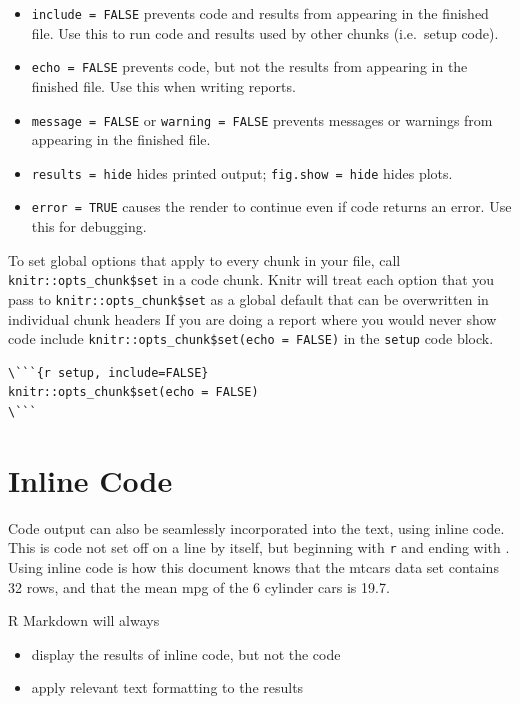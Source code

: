 \documentclass[]{book}
\providecommand{\tightlist}{%
  \setlength{\itemsep}{0pt}\setlength{\parskip}{0pt}}
\theoremstyle{definition}
\theoremstyle{definition}
\theoremstyle{definition}
\theoremstyle{remark}
\begin{document}
\begin{itemize}
\item
  \texttt{include\ =\ FALSE} prevents code and results from appearing in
  the finished file. Use this to run code and results used by other
  chunks (i.e.~setup code).
\item
  \texttt{echo\ =\ FALSE} prevents code, but not the results from
  appearing in the finished file. Use this when writing reports.
\item
  \texttt{message\ =\ FALSE} or \texttt{warning\ =\ FALSE} prevents
  messages or warnings from appearing in the finished file.
\item
  \texttt{results\ =\ \textquotesingle{}hide\textquotesingle{}} hides
  printed output;
  \texttt{fig.show\ =\ \textquotesingle{}hide\textquotesingle{}} hides
  plots.
\item
  \texttt{error\ =\ TRUE} causes the render to continue even if code
  returns an error. Use this for debugging.
\end{itemize}

To set global options that apply to every chunk in your file, call
\texttt{knitr::opts\_chunk\$set} in a code chunk. Knitr will treat each
option that you pass to \texttt{knitr::opts\_chunk\$set} as a global
default that can be overwritten in individual chunk headers If you are
doing a report where you would never show code include
\texttt{knitr::opts\_chunk\$set(echo\ =\ FALSE)} in the \texttt{setup}
code block.

\begin{verbatim}
\```{r setup, include=FALSE} 
knitr::opts_chunk$set(echo = FALSE)
\```
\end{verbatim}

\hypertarget{inline-code}{%
\section{Inline Code}\label{inline-code}}

Code output can also be seamlessly incorporated into the text, using
inline code. This is code not set off on a line by itself, but beginning
with \texttt{\textasciigrave{}r} and ending with
\texttt{\textasciigrave{}}. Using inline code is how this document knows
that the mtcars data set contains 32 rows, and that the mean mpg of the
6 cylinder cars is 19.7.

R Markdown will always

\begin{itemize}
\tightlist
\item
  display the results of inline code, but not the code
\item
  apply relevant text formatting to the results
\end{itemize}
\end{document}
